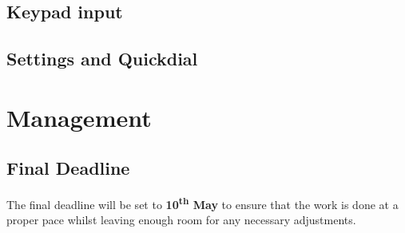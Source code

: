 \documentclass[11pt,a4paper,twocolumn]{scrartcl}
\begin{document}
%
%
%
%
%

%

\subsection{Keypad input} \label{keypad}

\subsection{Settings and Quickdial} \label{settings-quickdial}

\section{Management} \label{schedule}
\subsection{Final Deadline}
The final deadline will be set to \textbf{10\textsuperscript{th} May} to ensure that the work is done at a proper pace whilst leaving enough room for any necessary 
adjustments.
\end{document}
